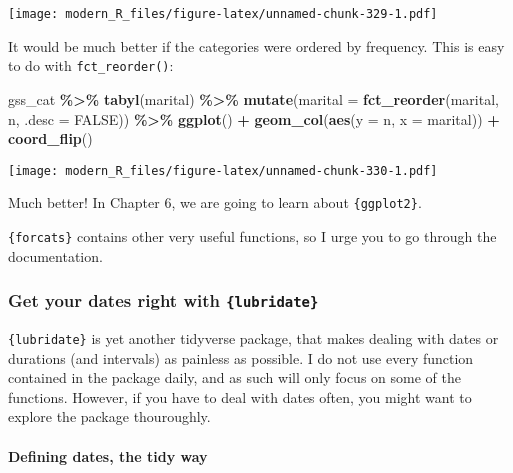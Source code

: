 \documentclass[
]{article}
\newenvironment{Shaded}{\begin{snugshade}}{\end{snugshade}}
\newcommand{\DataTypeTok}[1]{\textcolor[rgb]{0.13,0.29,0.53}{#1}}
\newcommand{\KeywordTok}[1]{\textcolor[rgb]{0.13,0.29,0.53}{\textbf{#1}}}
\newcommand{\NormalTok}[1]{#1}
\newcommand{\OperatorTok}[1]{\textcolor[rgb]{0.81,0.36,0.00}{\textbf{#1}}}
\newcommand{\OtherTok}[1]{\textcolor[rgb]{0.56,0.35,0.01}{#1}}
\newcommand{\StringTok}[1]{\textcolor[rgb]{0.31,0.60,0.02}{#1}}
\begin{document}
\texttt{[image: modern\_R\_files/figure-latex/unnamed-chunk-329-1.pdf]}

It would be much better if the categories were ordered by frequency. This is easy to do with
\texttt{fct\_reorder()}:

\begin{Shaded}
\begin{Highlighting}[]
\NormalTok{gss\_cat }\OperatorTok{\%\textgreater{}\%}
\StringTok{    }\KeywordTok{tabyl}\NormalTok{(marital) }\OperatorTok{\%\textgreater{}\%}
\StringTok{    }\KeywordTok{mutate}\NormalTok{(}\DataTypeTok{marital =} \KeywordTok{fct\_reorder}\NormalTok{(marital, n, }\DataTypeTok{.desc =} \OtherTok{FALSE}\NormalTok{)) }\OperatorTok{\%\textgreater{}\%}
\StringTok{    }\KeywordTok{ggplot}\NormalTok{() }\OperatorTok{+}
\StringTok{    }\KeywordTok{geom\_col}\NormalTok{(}\KeywordTok{aes}\NormalTok{(}\DataTypeTok{y =}\NormalTok{ n, }\DataTypeTok{x =}\NormalTok{ marital)) }\OperatorTok{+}
\StringTok{    }\KeywordTok{coord\_flip}\NormalTok{()}
\end{Highlighting}
\end{Shaded}

\texttt{[image: modern\_R\_files/figure-latex/unnamed-chunk-330-1.pdf]}

Much better! In Chapter 6, we are going to learn about \texttt{\{ggplot2\}}.

\texttt{\{forcats\}} contains other very useful functions, so I urge you to go through the documentation.

\hypertarget{get-your-dates-right-with-lubridate}{%
\subsubsection{\texorpdfstring{Get your dates right with \texttt{\{lubridate\}}}{Get your dates right with \{lubridate\}}}\label{get-your-dates-right-with-lubridate}}

\texttt{\{lubridate\}} is yet another tidyverse package, that makes dealing with dates or durations (and intervals) as
painless as possible. I do not use every function contained in the package daily, and as such will
only focus on some of the functions. However, if you have to deal with dates often,
you might want to explore the package thouroughly.

\hypertarget{defining-dates-the-tidy-way}{%
\paragraph{Defining dates, the tidy way}\label{defining-dates-the-tidy-way}}
\end{document}
